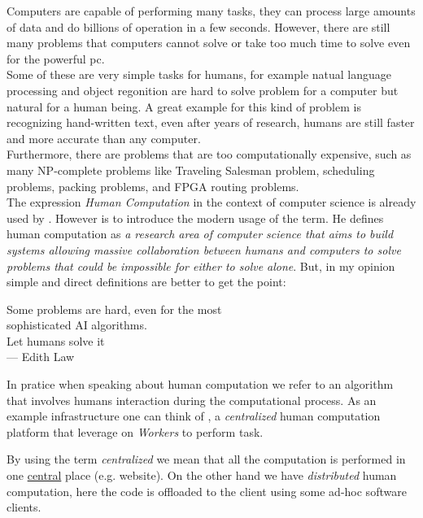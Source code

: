 
Computers are capable of performing many tasks, they can process large
amounts of data and do billions of operation in a few seconds.
However, there are still many problems that computers cannot solve
or take too much time to solve even for the powerful pc.\\

Some of these are very simple tasks for humans, for example natual language
processing and object regonition are hard to solve problem for a computer
but natural for a human being. A great example for this kind of problem
is recognizing hand-written text, even after years of research,
humans are still faster and more accurate than any computer.\\

Furthermore, there are problems that are too computationally expensive,
such as many NP-complete problems like Traveling Salesman problem,
scheduling problems, packing problems, and FPGA routing problems.\\

The expression \emph{Human Computation} in the context of computer
science is already used by \cite{cogprints499}. However is \cite{human:comp}
to introduce the modern usage of the term. He defines human computation
as \emph{a research area of computer science that aims to build systems allowing
massive collaboration between humans and computers to solve problems that
could be impossible for either to solve alone}. But, in my opinion simple
and direct definitions are better to get the point:
\begin{quoting}
	Some problems are hard, even for the most\\
	sophisticated AI algorithms.\\
	Let humans solve it\omissis\\
	\medskip
    {\rm --- Edith Law}
\end{quoting}

In pratice when speaking about human computation we refer to an algorithm that
involves humans interaction during the computational process. As an example
infrastructure one can think of , a \emph{centralized} human
computation platform that leverage on \emph{Workers} to perform task.

By using the term \emph{centralized} we mean that all the computation is
performed in one \underline{central} place (e.g.  website). On
the other hand we have \emph{distributed} human computation, here the code
is offloaded to the client using some ad-hoc software clients.







